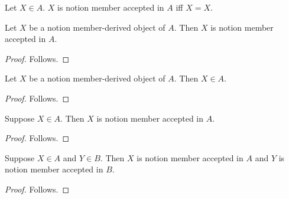 \begin{definition}\label{notion_member_accepted}
    Let $X\in A$.
    $X$ is notion member accepted in $A$ iff $X=X$.
\end{definition}

\begin{proposition}\label{notion_member_view_use}
    Let $X$ be a notion member-derived object of $A$.
    Then $X$ is notion member accepted in $A$.
\end{proposition}
\begin{proof}
    Follows.
\end{proof}

\begin{classification}\label{notion_member_conclusion_view}
    Let $X$ be a notion member-derived object of $A$.
    Then $X\in A$.
\end{classification}
\begin{proof}
    Follows.
\end{proof}

\begin{proposition}\label{notion_member_formula_use}
    Suppose $X\in A$.
    Then $X$ is notion member accepted in $A$.
\end{proposition}
\begin{proof}
    Follows.
\end{proof}

\begin{proposition}\label{notion_member_conjunction_use}
    Suppose $X\in A$ and $Y\in B$.
    Then $X$ is notion member accepted in $A$ and
        $Y$ is notion member accepted in $B$.
\end{proposition}
\begin{proof}
    Follows.
\end{proof}
